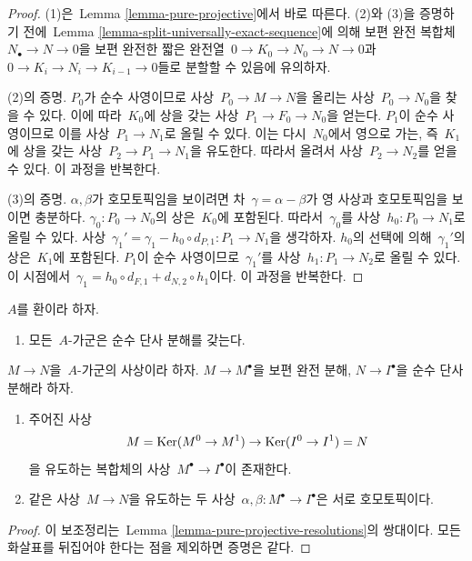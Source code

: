 \begin{proof}
(1)은\  Lemma \ref{lemma-pure-projective}에서 바로 따른다. (2)와 (3)을
증명하기 전에\  Lemma \ref{lemma-split-universally-exact-sequence}에 의해
보편 완전 복합체\  $N_\bullet \to N \to 0$을 보편 완전한 짧은 완전열\ 
$0 \to K_0 \to N_0 \to N \to 0$과\ 
$0 \to K_i \to N_i \to K_{i - 1} \to 0$들로 분할할 수 있음에
유의하자.

\medskip\noindent
(2)의 증명. $P_0$가 순수 사영이므로 사상\  $P_0 \to M \to N$을
올리는 사상\  $P_0 \to N_0$을 찾을 수 있다. 이에 따라\ 
$K_0$에 상을 갖는 사상\  $P_1 \to F_0 \to N_0$을 얻는다.
$P_1$이 순수 사영이므로 이를 사상\  $P_1 \to N_1$로 올릴 수 있다.
이는 다시\  $N_0$에서 영으로 가는, 즉\  $K_1$에 상을 갖는 사상\ 
$P_2 \to P_1 \to N_1$을 유도한다. 따라서 올려서 사상\ 
$P_2 \to N_2$를 얻을 수 있다. 이 과정을 반복한다.

\medskip\noindent
(3)의 증명. $\alpha, \beta$가 호모토픽임을 보이려면 차\ 
$\gamma = \alpha - \beta$가 영 사상과 호모토픽임을 보이면 충분하다.
$\gamma_0 : P_0 \to N_0$의 상은\  $K_0$에 포함된다. 따라서\ 
$\gamma_0$를 사상\  $h_0 : P_0 \to N_1$로 올릴 수 있다. 사상\ 
$\gamma_1' = \gamma_1 - h_0 \circ d_{P, 1} : P_1 \to N_1$을
생각하자. $h_0$의 선택에 의해\  $\gamma_1'$의 상은\  $K_1$에 포함된다.
$P_1$이 순수 사영이므로\  $\gamma_1'$를 사상\ 
$h_1 : P_1 \to N_2$로 올릴 수 있다. 이 시점에서\ 
$\gamma_1 = h_0 \circ d_{F, 1} + d_{N, 2} \circ h_1$이다.
이 과정을 반복한다.
\end{proof}

\begin{lemma}
\label{lemma-pure-injective-resolutions}
$A$를 환이라 하자.
\begin{enumerate}
\item 모든\  $A$-가군은 순수 단사 분해를 갖는다.
\end{enumerate}
$M \to N$을\  $A$-가군의 사상이라 하자. $M \to M^\bullet$을
보편 완전 분해, $N \to I^\bullet$을 순수 단사 분해라 하자.
\begin{enumerate}
\item[(2)] 주어진 사상
$$
M = \mathop{\mathrm{Ker}}(M^0 \to M^1) \to \mathop{\mathrm{Ker}}(I^0 \to I^1) = N
$$
을 유도하는 복합체의 사상\  $M^\bullet \to I^\bullet$이 존재한다.
\item[(3)] 같은 사상\  $M \to N$을 유도하는 두 사상\ 
$\alpha, \beta : M^\bullet \to I^\bullet$은 서로 호모토픽이다.
\end{enumerate}
\end{lemma}

\begin{proof}
이 보조정리는\  Lemma \ref{lemma-pure-projective-resolutions}의 쌍대이다.
모든 화살표를 뒤집어야 한다는 점을 제외하면 증명은 같다.
\end{proof}

